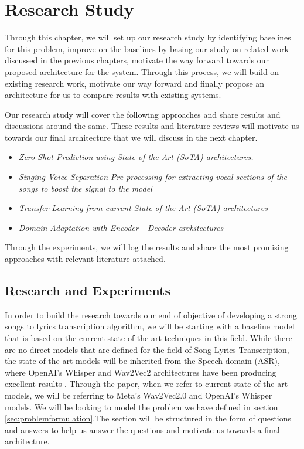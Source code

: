 
\chapter{Research Study}%
\label{sec:researchstudy}


Through this chapter, we will set up our research study by identifying baselines for this problem, improve on the baselines by basing our study on related work discussed in the previous chapters, motivate the way forward towards our proposed architecture for the system. Through this process, we will build on existing research work, motivate our way forward and finally propose an architecture for us to compare results with existing systems. 

Our research study will cover the following approaches and share results and discussions around the same. These results and literature reviews will motivate us towards our final architecture that we will discuss in the next chapter.

\begin{itemize}
    \item \textit{Zero Shot Prediction using State of the Art (SoTA) architectures.}
    \item  \textit{Singing Voice Separation Pre-processing for extracting vocal sections of the songs to boost the signal to the model}
    \item  \textit{Transfer Learning from current State of the Art (SoTA) architectures}
    \item  \textit{Domain Adaptation with Encoder - Decoder architectures}
\end{itemize}

Through the experiments, we will log the results and share the most promising approaches with relevant literature attached. 


\section{Research and Experiments}%
\label{sec:experiments}

In order to build the research towards our end of objective of developing a strong songs to lyrics transcription algorithm, we will be starting with a baseline model that is based on the current state of the art techniques in this field. While there are no direct models that are defined for the field of Song Lyrics Transcription, the state of the art models will be inherited from the Speech domain (ASR), where OpenAI's Whisper and Wav2Vec2 architectures have been producing excellent results \cite{baevski2020wav2vec} \cite{radford2023robust}. Through the paper, when we refer to current state of the art models, we will be referring to Meta's Wav2Vec2.0 and OpenAI's Whisper models. We will be looking to model the problem we have defined in section \ref{sec:problemformulation}.The section will be structured in the form of questions and answers to help us answer the questions and motivate us towards a final architecture.

